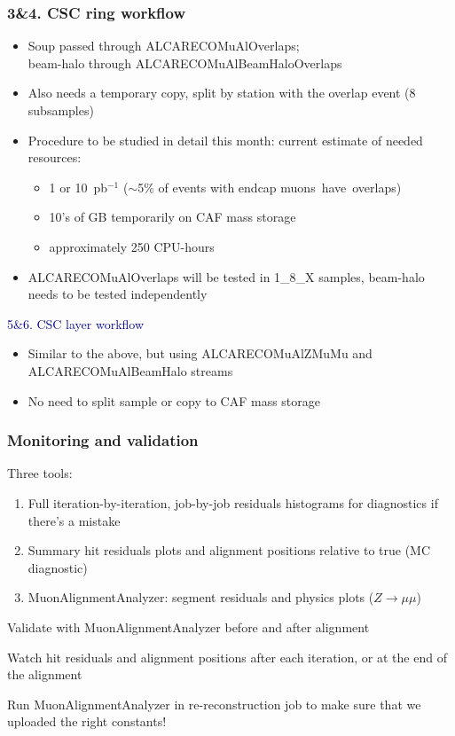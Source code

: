 \documentclass[compress]{beamer}
\begin{document}
\begin{frame}
\frametitle{3{\small \&}4. CSC ring workflow}

\begin{itemize}
\item Soup passed through ALCARECOMuAlOverlaps; \\ beam-halo through ALCARECOMuAlBeamHaloOverlaps
\item Also needs a temporary copy, split by station with the overlap event (8 subsamples)
\item Procedure to be studied in detail this month: current estimate of needed resources:
\begin{itemize}
\item 1 or 10~pb$^{-1}$ ($\sim$5\% of events with endcap \mbox{muons have overlaps)\hspace{-1 cm}}
\item 10's of GB temporarily on CAF mass storage
\item approximately 250 CPU-hours
\end{itemize}
\item ALCARECOMuAlOverlaps will be tested in 1\_8\_X samples, beam-halo needs to be tested independently
\end{itemize}

\vfill
\hspace{-0.83 cm} \textcolor{darkblue}{\Large 5{\small \&}6. CSC layer workflow}

\begin{itemize}
\item Similar to the above, but using ALCARECOMuAlZMuMu and ALCARECOMuAlBeamHalo streams
\item No need to split sample or copy to CAF mass storage
\end{itemize}
\end{frame}

\begin{frame}
\frametitle{Monitoring and validation}

Three tools:
\begin{enumerate}
\item Full iteration-by-iteration, job-by-job residuals histograms for diagnostics if there's a mistake
\item Summary hit residuals plots and alignment positions relative to true (MC diagnostic)
\item MuonAlignmentAnalyzer: segment residuals and physics plots ($Z\to\mu\mu$)
\end{enumerate}

\vfill
Validate with MuonAlignmentAnalyzer before and after alignment

\vfill
Watch hit residuals and alignment positions after each iteration, or at the end of the alignment

\vfill
Run MuonAlignmentAnalyzer in re-reconstruction job to make sure that we uploaded the right constants!
\end{frame}
\end{document}
